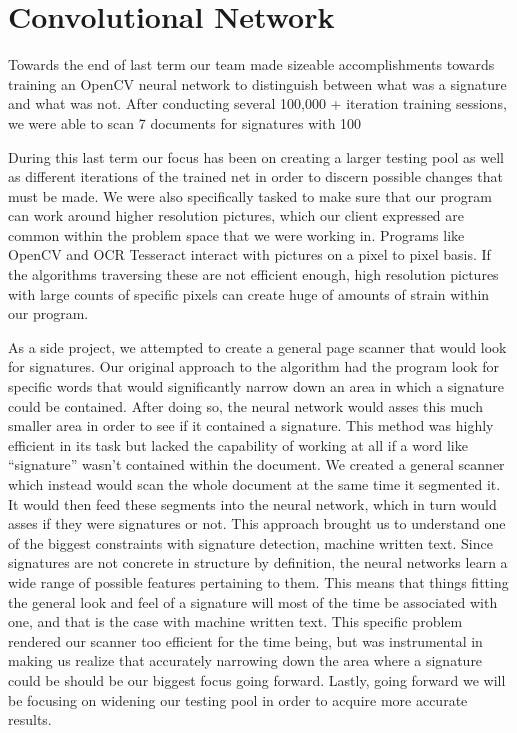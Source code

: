 \documentclass[onecolumn, draftclsnofoot,10pt, compsoc]{IEEEtran}
\begin{document}
\section{Convolutional Network}
Towards the end of last term our team made sizeable accomplishments towards training an OpenCV neural network to distinguish between what was a signature and what was not. After conducting several 100,000 + iteration training sessions, we were able to scan 7 documents for signatures with 100%

During this last term our focus has been on creating a larger testing pool as well as different iterations of the trained net in order to discern possible changes that must be made. We were also specifically tasked to make sure that our program can work around higher resolution pictures, which our client expressed are common within the problem space that we were working in. Programs like OpenCV and OCR Tesseract interact with pictures on a pixel to pixel basis. If the algorithms traversing these are not efficient enough, high resolution pictures with large counts of specific pixels can create huge of amounts of strain within our program.

As a side project, we attempted to create a general page scanner that would look for signatures. Our original approach to the algorithm had the program look for specific words that would significantly narrow down an area in which a signature could be contained. After doing so, the neural network would asses this much smaller area in order to see if it contained a signature. This method was highly efficient in its task but lacked the capability of working at all if a word like “signature” wasn’t contained within the document. We created a general scanner which instead would scan the whole document at the same time it segmented it. It would then feed these segments into the neural network, which in turn would asses if they were signatures or not. This approach brought us to understand one of the biggest constraints with signature detection, machine written text. Since signatures are not concrete in structure by definition, the neural networks learn a wide range of possible features pertaining to them. This means that things fitting the general look and feel of a signature will most of the time be associated with one, and that is the case with machine written text. This specific problem rendered our scanner too efficient for the time being, but was instrumental in making us realize that accurately narrowing down the area where a signature could be should be our biggest focus going forward. Lastly, going forward we will be focusing on widening our testing pool in order to acquire more accurate results. 
\end{document}
